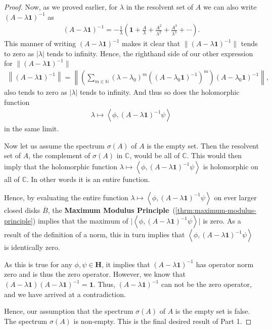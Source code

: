 \begin{proof}
Now, as we proved earlier, for $\lambda$ in the resolvent set of $A$ we can also write $(A - \lambda \mathbf{1})^{-1}$ as
\begin{align}
    (A - \lambda \mathbf{1})^{-1} = - \frac{1}{\lambda} \left( \mathbf{1} + \frac{A}{\lambda} + \frac{A^2}{\lambda^2} + \frac{A^3}{\lambda^3} + \cdots \right).
\end{align}
This manner of writing $(A - \lambda \mathbf{1})^{-1}$ makes it clear that $\|(A - \lambda \mathbf{1})^{-1}\|$ tends to zero as $\lvert \lambda \rvert$ tends to infinity. Hence, the righthand side of our other expression for $\| (A - \lambda \mathbf{1})^{-1} \|$
\begin{align}
    \left\| (A - \lambda \mathbf{1})^{-1} \right\| = \left\| \left( \sum_{m \in \mathbb{N}} (\lambda - \lambda_0)^m ((A - \lambda_0 \mathbf{1})^{-1})^m \right) (A - \lambda_0 \mathbf{1})^{-1} \right\|,
\end{align}
also tends to zero as $\lvert \lambda \rvert$ tends to infinity. And thus so does the holomorphic function
\begin{align}
    \lambda \longmapsto \left< \phi, (A - \lambda \mathbf{1})^{-1} \psi \right>
\end{align}
in the same limit.

Now let us assume the spectrum $\sigma(A)$ of $A$ is the empty set. Then the resolvent set of $A$, the complement of $\sigma(A)$ in $\mathbb{C}$, would be all of $\mathbb{C}$. This would then imply that the holomorphic function $\lambda \mapsto \left< \phi, (A - \lambda \mathbf{1})^{-1} \psi \right>$ is holomorphic on all of $\mathbb{C}$. In other words it is an entire function.

Hence, by evaluating the entire function $\lambda \mapsto \left< \phi, (A - \lambda \mathbf{1})^{-1} \psi \right>$ on ever larger closed disks $\overline{B}$, the \textbf{Maximum Modulus Principle}~(\ref{thrm:maximum-modulus-principle}) implies that the maximum of $\lvert \left< \phi, (A - \lambda \mathbf{1})^{-1} \psi \right> \rvert$ is zero. As a result of the definition of a norm, this in turn implies that $\left< \phi, (A - \lambda \mathbf{1})^{-1} \psi \right>$ is identically zero.

As this is true for any $\phi, \psi \in \mathbf{H}$, it implies that $(A - \lambda \mathbf{1})^{-1}$ has operator norm zero and is thus the zero operator. However, we know that $(A - \lambda \mathbf{1})(A - \lambda \mathbf{1})^{-1} = \mathbf{1}$. Thus, $(A - \lambda \mathbf{1})^{-1}$ can not be the zero operator, and we have arrived at a contradiction.

Hence, our assumption that the spectrum $\sigma(A)$ of $A$ is the empty set is false. The spectrum $\sigma(A)$ is non-empty. This is the final desired result of Part 1.
\end{proof}

